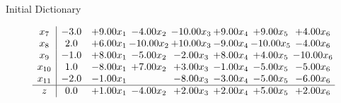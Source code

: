 \documentclass[8pt]{article}
\begin{document}
Initial Dictionary 

\[\begin{array}{c| c c@{\hskip 2pt} c@{\hskip 2pt} c@{\hskip 2pt} c@{\hskip 2pt} c@{\hskip 2pt} c@{\hskip 2pt} }
 x_{7}   &  -3.0 & +  9.00 x_{1} & -4.00 x_{2} & -10.00 x_{3} & +  9.00 x_{4} & +  9.00 x_{5} & +  4.00 x_{6}\\
 x_{8}   &  2.0 & +  6.00 x_{1} & -10.00 x_{2} & + 10.00 x_{3} & -9.00 x_{4} & -10.00 x_{5} & -4.00 x_{6}\\
 x_{9}   &  -1.0 & +  8.00 x_{1} & -5.00 x_{2} & -2.00 x_{3} & +  8.00 x_{4} & +  4.00 x_{5} & -10.00 x_{6}\\
 x_{10}   &  1.0 & -8.00 x_{1} & +  7.00 x_{2} & +  3.00 x_{3} & -1.00 x_{4} & -5.00 x_{5} & -5.00 x_{6}\\
 x_{11}   &  -2.0 & -1.00 x_{1} &   & -8.00 x_{3} & -3.00 x_{4} & -5.00 x_{5} & -6.00 x_{6}\\
\hline
z    &  0.0 & +  1.00 x_{1} & -4.00 x_{2} & +  2.00 x_{3} & +  2.00 x_{4} & +  5.00 x_{5} & +  2.00 x_{6}\\
\end{array}\]
\end{document}
